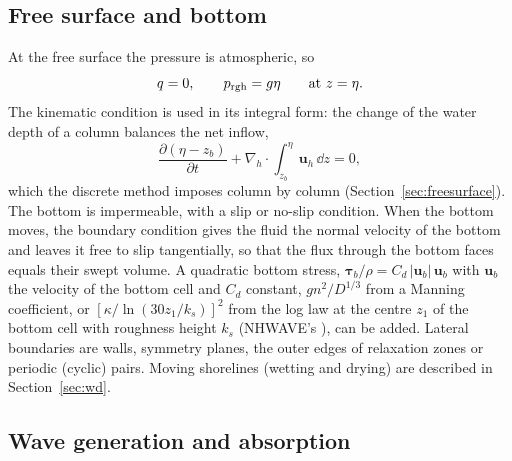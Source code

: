 \subsection{Free surface and bottom}
\label{sec:bc}

At the free surface the pressure is atmospheric, so
\begin{equation}
  q = 0, \qquad p_{\mathrm{rgh}} = g\eta \qquad \text{at } z=\eta .
  \label{eq:dynamic}
\end{equation}
The kinematic condition is used in its integral form: the change of the
water depth of a column balances the net inflow,
\begin{equation}
  \frac{\partial (\eta - z_b)}{\partial t} + \nabla_h\cdot \int_{z_b}^{\eta}\bm{u}_h\,\dd z = 0 ,
  \label{eq:kinematic}
\end{equation}
which the discrete method imposes column by column
(Section~\ref{sec:freesurface}). The bottom is impermeable, with a slip or
no-slip condition. When the bottom moves, the boundary condition
 gives the fluid the normal velocity of the bottom
and leaves it free to slip tangentially, so that the flux through the bottom
faces equals their swept volume. A quadratic bottom stress,
$\bm{\tau}_b/\rho = C_d\,|\bm{u}_b|\,\bm{u}_b$ with $\bm{u}_b$ the velocity of
the bottom cell and $C_d$ constant, $g n^2/D^{1/3}$ from a Manning coefficient,
or $[\kappa/\ln(30z_1/k_s)]^2$ from the log law at the centre $z_1$ of the
bottom cell with roughness height $k_s$ (NHWAVE's ), can be added.
Lateral boundaries are walls, symmetry planes, the outer edges of relaxation
zones or periodic (cyclic) pairs. Moving shorelines (wetting and drying) are described in
Section~\ref{sec:wd}.

\subsection{Wave generation and absorption}
\label{sec:zones}

